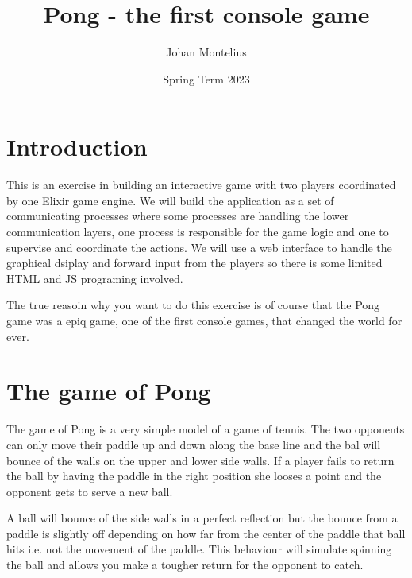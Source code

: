 \documentclass[a4paper,11pt]{article}
\begin{document}
\title{Pong - the first console game}

\author{Johan Montelius}
\date{Spring Term 2023}

\maketitle


\section*{Introduction}

This is an exercise in building an interactive game with two players
coordinated by one Elixir game engine. We will build the application
as a set of communicating processes where some processes are handling
the lower communication layers, one process is responsible for the
game logic and one to supervise and coordinate the actions. We will
use a web interface to handle the graphical dsiplay and forward input
from the players so there is some limited HTML and JS programing
involved.

The true reasoin why you want to do this exercise is of course that
the Pong game was a epiq game, one of the first console games, that
changed the world for ever. 

\section*{The game of Pong}

The game of Pong is a very simple model of a game of tennis. The two
opponents can only move their paddle up and down along the base line
and the bal will bounce of the walls on the upper and lower side
walls. If a player fails to return the ball by having the paddle in
the right position she looses a point and the opponent gets to serve a
new ball.

A ball will bounce of the side walls in a perfect reflection but the
bounce from a paddle is slightly off depending on how far from the
center of the paddle that ball hits i.e. not the movement of the
paddle. This behaviour will simulate spinning the ball and allows you
make a tougher return for the opponent to catch. 
\end{document}
